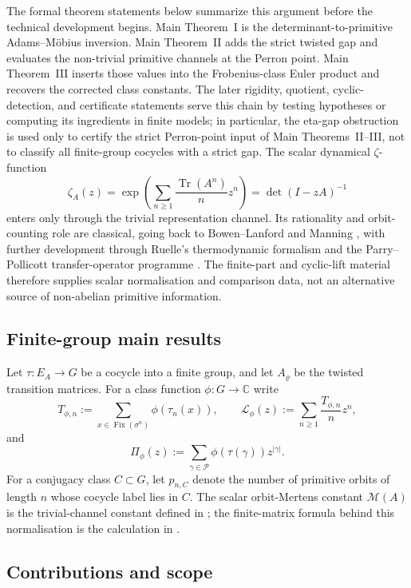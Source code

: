 \documentclass[11pt,a4paper]{amsart}
\theoremstyle{plain}
\theoremstyle{definition}
\theoremstyle{remark}
\DeclareMathOperator{\Tr}{Tr}
\newcommand{\CC}{\mathbb{C}}
\newcommand{\cP}{\mathcal P}
\begin{document}
The formal theorem statements below summarize this argument before the
technical development begins.  Main Theorem~I is the determinant-to-primitive
Adams--M\"obius inversion.  Main Theorem~II adds the strict twisted gap
and evaluates the non-trivial primitive channels at the Perron point.
Main Theorem~III inserts those values into the Frobenius-class Euler
product and recovers the corrected class constants.  The later rigidity,
quotient, cyclic-detection, and certificate statements serve
this chain by testing hypotheses or computing its ingredients in finite
models; in particular, the eta-gap obstruction is used only to certify the
strict Perron-point input of Main Theorems~II--III, not to classify all
finite-group cocycles with a strict gap.  The scalar dynamical \(\zeta\)-function
\[
  \zeta_A(z)
  =\exp\!\left(\sum_{n\ge 1}\frac{\Tr(A^n)}{n}z^n\right)
  =\det(I-zA)^{-1}
\]
enters only through the trivial representation channel. Its rationality
and orbit-counting role are classical, going back to
Bowen--Lanford \cite{BowenLanford1970Zeta} and Manning
\cite{Manning1971Axiom}, with further development through Ruelle's
thermodynamic formalism
\cite{Ruelle1976ZetaExpanding,Ruelle1978Thermodynamic} and the
Parry--Pollicott transfer-operator programme
\cite{ParryPollicott1990Zeta}. The finite-part and cyclic-lift material
therefore supplies scalar normalisation and comparison data, not an
alternative source of non-abelian primitive information.

\subsection{Finite-group main results}

Let \(\tau:E_A\to G\) be a cocycle into a finite group, and let
\(A_\varrho\) be the twisted transition matrices. For a class function
\(\phi:G\to\CC\) write
\[
  T_{\phi,n}:=\sum_{x\in\operatorname{Fix}(\sigma^n)}
    \phi(\tau_n(x)),
  \qquad
  \mathcal L_\phi(z):=\sum_{n\ge 1}\frac{T_{\phi,n}}{n}z^n,
\]
and
\[
  \Pi_\phi(z):=\sum_{\gamma\in\cP}\phi(\tau(\gamma))z^{|\gamma|}.
\]
For a conjugacy class \(C\subset G\), let \(p_{n,C}\) denote the number
of primitive orbits of length \(n\) whose cocycle label lies in \(C\).
The scalar orbit-Mertens constant \(\mathcal M(A)\) is the
trivial-channel constant defined in ; the
  finite-matrix formula behind this normalisation is the calculation in
  .

\subsection{Contributions and scope}\label{sec:intro-scope-of-results}
\end{document}
